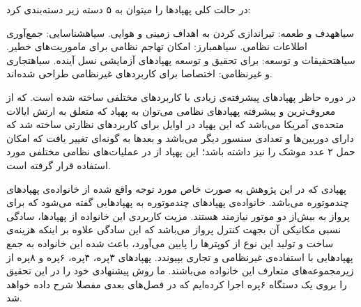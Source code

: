 \noindent در حالت کلی پهپادها را میتوان به ۵ دسته زیر دسته‌بندی کرد:
\begin{enumerate}\setlength\itemsep{0em}
 ‌سیاه{هدف و طعمه:} تیراندازی کردن به اهداف زمینی و هوایی.
 ‌سیاه{شناسایی:} جمع‌آوری اطلاعات نظامی.
 ‌سیاه{مبارز:} امکان تهاجم نظامی برای ماموریت‌های خطیر.
 ‌سیاه{تحقیقات و توسعه:} برای تحقیق و توسعه پهپادهای آزمایشی نسل آینده.
 ‌سیاه{تجاری و غیرنظامی:} اختصاصا برای کاربردهای غیرنظامی طراحی شده‌اند.
\end{enumerate}

در دوره حاظر پهپادهای پیشرفته‌ی زیادی با کاربردهای مختلفی ساخته شده است. که از معروف‌ترین و پیشرفته پهپادهای نظامی می‌توان به پهپاد  که متعلق به ارتش ایالات متحده‌ی آمریکا می‌باشد که این پهپاد در اوایل  برای کاربردهای نظارتی ساخته شد که دارای دوربین‌ها و تعدادی سنسور دیگر می‌باشد و بعدها به گونه‌ای تغییر یافت که امکان حمل ۲ عدد موشک را نیز داشته باشد؛ این پهپاد از  در عملیات‌های نظامی مختلفی مورد استفاده قرار گرفته است.


پهپادی که در این پژوهش به صورت خاص مورد توجه واقع شده از خانواده‌ی پهپاد‌های چندموتوره می‌باشد. خانواده‌ی پهپادهای چندموتوره به پهپادهایی گفته می‌شود که برای پرواز به بیش‌از دو موتور نیازمند هستند. مزیت کاربردی این خانواده از پهپادها، سادگی نسبی مکانیکی آن بجهت کنترل پرواز می‌باشد که این سادگی علاوه بر اینکه هزینه‌ی ساخت و تولید این نوع از کوپترها را پایین می‌آورد، باعث شده این خانواده به جمع پهپادهایی با استفاده‌ی غیرنظامی و تجاری بپیوندد. پهپادهای ۳پره، ۴پره، ۶پره و ۸پره از زیرمجموعه‌های متعارف این خانواده می‌باشند. ما روش پیشنهادی خود را در این تحقیق را بروی یک دستگاه ۶پره اجرا کرده‌ایم که در فصل‌های بعدی مفصلا شرح داده خواهد شد.


